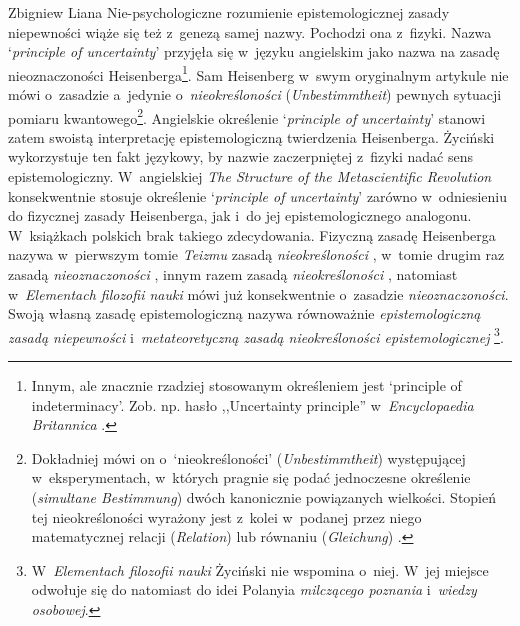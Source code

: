 \begin{artplenv}{Zbigniew Liana}
\enlargethispage{-\baselineskip}
Nie-psychologiczne rozumienie epistemologicznej zasady niepewności wiąże się też z~genezą samej nazwy. Pochodzi ona z~fizyki. Nazwa ‘\textit{principle of uncertainty}' przyjęła się w~języku angielskim jako nazwa na zasadę nieoznaczoności Heisenberga\footnote{Innym, ale znacznie rzadziej stosowanym określeniem jest ‘principle of indeterminacy'. Zob. np. hasło ,,Uncertainty principle'' w~\textit{Encyclopaedia Britannica}
\parencite*[][]{noauthor_uncertainty_2020}.%
}. Sam Heisenberg w~swym oryginalnym artykule 
\parencite*[][s.~179nn]{heisenberg_uber_1927} %
 nie mówi o~zasadzie a~jedynie o~\textit{nieokreśloności} (\textit{Unbestimmtheit}) pewnych sytuacji pomiaru kwantowego\footnote{Dokładniej mówi on o~‘nieokreśloności' (\textit{Unbestimmtheit}) występującej w~eksperymentach, w~których pragnie się podać jednoczesne określenie (\textit{simultane Bestimmung}) dwóch kanonicznie powiązanych wielkości. Stopień tej nieokreśloności wyrażony jest z~kolei w~podanej przez niego matematycznej relacji (\textit{Relation}) lub równaniu (\textit{Gleichung}) 
\parencite[][s.~179.181]{heisenberg_uber_1927}.%
}. Angielskie określenie ‘\textit{principle of uncertainty}' stanowi zatem swoistą interpretację epistemologiczną twierdzenia Heisenberga. Życiński wykorzystuje ten fakt językowy, by nazwie zaczerpniętej z~fizyki nadać sens epistemologiczny. W~angielskiej \textit{The Structure of the Metascientific Revolution} 
\parencite*[][]{zycinski_structure_1988} %
 konsekwentnie stosuje określenie ‘\textit{principle of uncertainty}' zarówno w~odniesieniu do fizycznej zasady Heisenberga, jak i~do jej epistemologicznego analogonu. W~książkach polskich brak takiego zdecydowania. Fizyczną zasadę Heisenberga nazywa w~pierwszym tomie \textit{Teizmu} zasadą \textit{nieokreśloności} 
\parencite[][s.~118.159]{zycinski_teizm_1985}, %
 w~tomie drugim raz zasadą \textit{nieoznaczoności} 
\parencite[][s.~24]{zycinski_teizm_1988}, %
 innym razem zasadą \textit{nieokreśloności} 
\parencite[][s.~63]{zycinski_teizm_1988}, %
 natomiast w~\textit{Elementach filozofii nauki} 
\parencites*[][]{zycinski_elementy_1996}[][]{zycinski_elementy_2015} %
 mówi już konsekwentnie o~zasadzie \textit{nieoznaczoności}. Swoją własną zasadę epistemologiczną nazywa równoważnie \textit{epistemologiczną zasadą niepewności} i~\textit{metateoretyczną zasadą nieokreśloności epistemologicznej} 
\parencite[][s.~159]{zycinski_teizm_1985}%
\footnote{W~\textit{Elementach filozofii nauki} 
\parencites*[][]{zycinski_elementy_1996}[][]{zycinski_elementy_2015} %
 Życiński nie wspomina o~niej. W~jej miejsce odwołuje się do natomiast do idei Polanyia \textit{milczącego poznania} i~\textit{wiedzy osobowej}.}.


\end{artplenv}
